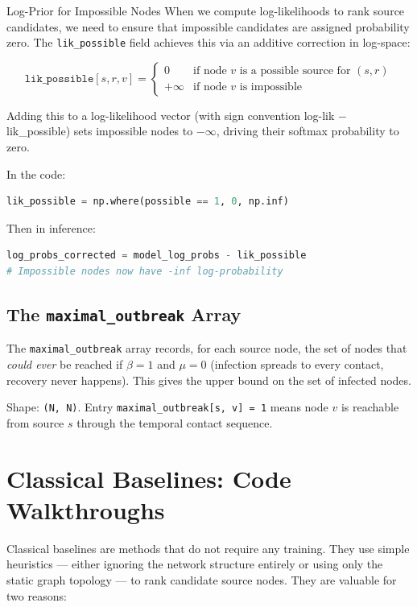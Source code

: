 \begin{mathbox}{Log-Prior for Impossible Nodes}
When we compute log-likelihoods to rank source candidates, we need to ensure that impossible candidates are assigned probability zero. The \texttt{lik\_possible} field achieves this via an additive correction in log-space:

\[
\texttt{lik\_possible}[s, r, v] = \begin{cases}
0 & \text{if node } v \text{ is a possible source for } (s, r) \\
+\infty & \text{if node } v \text{ is impossible}
\end{cases}
\]

Adding this to a log-likelihood vector (with sign convention log-lik $-$ lik\_possible) sets impossible nodes to $-\infty$, driving their softmax probability to zero.

In the code:
\begin{lstlisting}[language=Python]
lik_possible = np.where(possible == 1, 0, np.inf)
\end{lstlisting}
Then in inference:
\begin{lstlisting}[language=Python]
log_probs_corrected = model_log_probs - lik_possible
# Impossible nodes now have -inf log-probability
\end{lstlisting}
\end{mathbox}

\subsection{The \texttt{maximal\_outbreak} Array}

The \texttt{maximal\_outbreak} array records, for each source node, the set of nodes that \emph{could ever} be reached if $\beta = 1$ and $\mu = 0$ (infection spreads to every contact, recovery never happens). This gives the upper bound on the set of infected nodes.

Shape: \texttt{(N, N)}. Entry \texttt{maximal\_outbreak[s, v] = 1} means node $v$ is reachable from source $s$ through the temporal contact sequence.

\section{Classical Baselines: Code Walkthroughs}
\label{sec:baselines}

Classical baselines are methods that do not require any training. They use simple heuristics --- either ignoring the network structure entirely or using only the static graph topology --- to rank candidate source nodes. They are valuable for two reasons:

